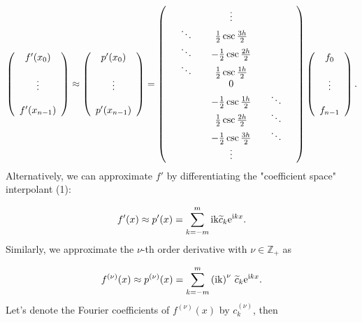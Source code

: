 \documentclass[12pt,a4paper]{article}
\begin{document}
\[
\left(
\begin{array}{c}
f'(x_0) \\
  \\
\vdots  \\
  \\
f'(x_{n-1})
\end{array}
\right) \approx 
\left(
\begin{array}{c}
p'(x_0) \\
  \\
\vdots  \\
  \\
p'(x_{n-1})
\end{array}
\right) = 
\left(
\begin{array}{c c c c c c c}
  &       &       & \vdots  &   &   & \\
  &\ddots &       & \frac{1}{2}\csc \frac{3h}{2}   &   &    &  \\
   &\ddots &      &-\frac{1}{2}\csc \frac{2h}{2}   &   &    &  \\ 
   &\ddots &      & \frac{1}{2}\csc \frac{1h}{2}   &   &    &   \\
  &        &      & 0                              &   &    &   \\
&      &      & -\frac{1}{2}\csc \frac{1h}{2}   &   &   \ddots &  \\
&      &      & \frac{1}{2}\csc \frac{2h}{2}   &   &   \ddots &  \\
&      &      & -\frac{1}{2}\csc \frac{3h}{2}   &   &   \ddots &  \\
&      &      & \vdots  &   &    &  \\
\end{array}
\right)
\left(
\begin{array}{c}
f_0 \\
  \\
\vdots  \\
  \\
f_{n-1}
\end{array}
\right).
\]
Alternatively, we can approximate $f'$ by differentiating the "coefficient space" interpolant (1):

\[
f'(x) \approx p'(x) = \sum_{k=-m}^{m} {\rm i k}\widetilde{c}_k{\rm e}^{{\rm i}kx}.
\]
Similarly, we approximate the $\nu$-th order derivative with $\nu \in \mathbb{Z}_+$ as

\[
f^{(\nu)}(x) \approx p^{(\nu)}(x) = \sum_{k=-m}^{m} \left({\rm i k}\right)^{\nu}\,\widetilde{c}_k{\rm e}^{{\rm i}kx}.
\]
Let's denote the Fourier coefficients of $f^{(\nu)}(x)$ by $c_k^{(\nu)}$, then
\end{document}

